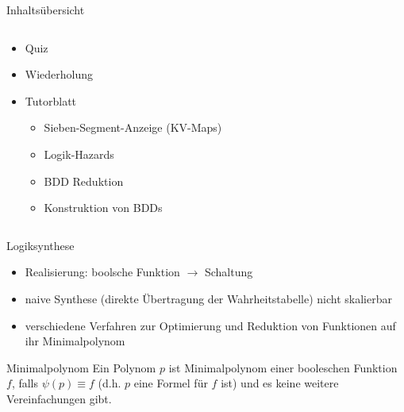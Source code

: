 \documentclass[
  german,            %
  aspectratio=169,    %
]{tumbeamer}
\begin{document}
\begin{frame}[c]{Inhaltsübersicht}{}
  \begin{columns}[c]
    \begin{column}{1\textwidth}
      \begin{itemize}
        \item Quiz
        \item Wiederholung
        \item Tutorblatt
        \begin{itemize}
			\item Sieben-Segment-Anzeige (KV-Maps)
			\item Logik-Hazards
			\item BDD Reduktion
			\item Konstruktion von BDDs
        \end{itemize}
      \end{itemize}
    \end{column}
  \end{columns}
\end{frame}

\begin{frame}[fragile, c]{Logiksynthese}{}
	\begin{itemize}
		\item Realisierung: boolsche Funktion $\rightarrow$ Schaltung
		\item naive Synthese (direkte Übertragung der Wahrheitstabelle) nicht skalierbar
		\item verschiedene Verfahren zur Optimierung und Reduktion von Funktionen auf ihr Minimalpolynom
	\end{itemize}
	\begin{block}{Minimalpolynom}
		Ein Polynom $p$ ist Minimalpolynom einer booleschen Funktion $f$, falls  $\psi(p) \equiv f$ (d.h. $p$ eine Formel für $f$ ist) und es keine weitere Vereinfachungen gibt.
	\end{block}
\end{frame}
\end{document}

